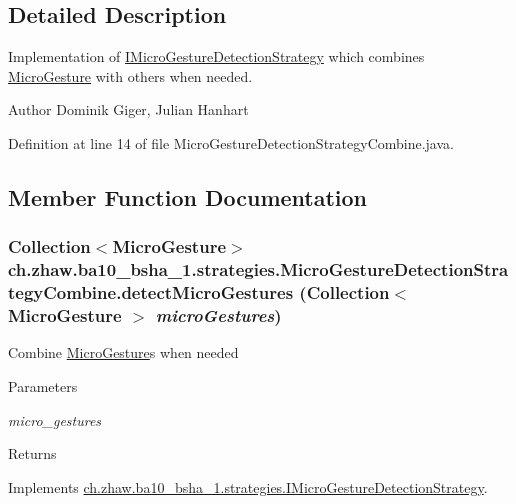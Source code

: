 \subsection{Detailed Description}
Implementation of \hyperlink{interfacech_1_1zhaw_1_1ba10__bsha__1_1_1strategies_1_1IMicroGestureDetectionStrategy}{IMicroGestureDetectionStrategy} which combines \hyperlink{}{MicroGesture} with others when needed.

\begin{DoxyAuthor}{Author}
Dominik Giger, Julian Hanhart 
\end{DoxyAuthor}


Definition at line 14 of file MicroGestureDetectionStrategyCombine.java.

\subsection{Member Function Documentation}
\hypertarget{classch_1_1zhaw_1_1ba10__bsha__1_1_1strategies_1_1MicroGestureDetectionStrategyCombine_a5487e41dc2d1b6dbe493b5a8420c050f}{
\subsubsection[{detectMicroGestures}]{\setlength{\rightskip}{0pt plus 5cm}Collection$<${\bf MicroGesture}$>$ ch.zhaw.ba10\_\-bsha\_\-1.strategies.MicroGestureDetectionStrategyCombine.detectMicroGestures (Collection$<$ {\bf MicroGesture} $>$ {\em microGestures})}}
\label{classch_1_1zhaw_1_1ba10__bsha__1_1_1strategies_1_1MicroGestureDetectionStrategyCombine_a5487e41dc2d1b6dbe493b5a8420c050f}
Combine \hyperlink{}{MicroGesture}s when needed


\begin{DoxyParams}{Parameters}
\item[{\em micro\_\-gestures}]\end{DoxyParams}
\begin{DoxyReturn}{Returns}

\end{DoxyReturn}


Implements \hyperlink{interfacech_1_1zhaw_1_1ba10__bsha__1_1_1strategies_1_1IMicroGestureDetectionStrategy_a8593331fb67e5d4dc890d3db9f2d1b58}{ch.zhaw.ba10\_\-bsha\_\-1.strategies.IMicroGestureDetectionStrategy}.

